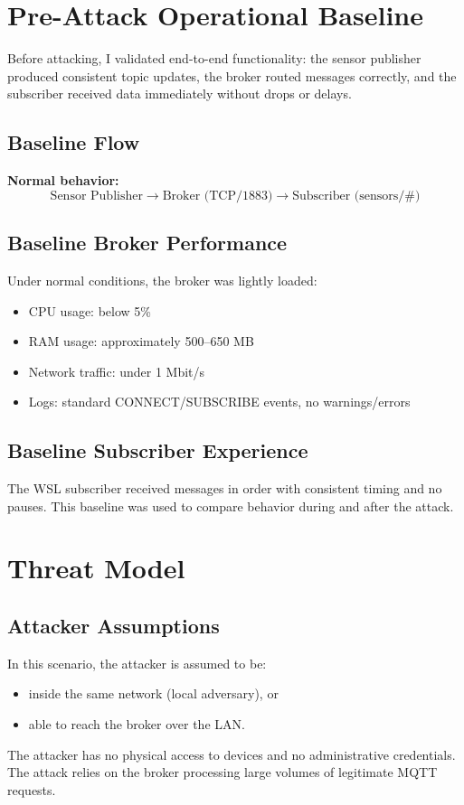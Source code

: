 \documentclass[11pt]{article}
\begin{document}
\section{Pre-Attack Operational Baseline}
Before attacking, I validated end-to-end functionality: the sensor publisher produced consistent topic updates, the broker routed messages correctly, and the subscriber received data immediately without drops or delays.

\subsection{Baseline Flow}
\textbf{Normal behavior:}
\[
\text{Sensor Publisher} \rightarrow \text{Broker (TCP/1883)} \rightarrow \text{Subscriber (sensors/\#)}
\]

\subsection{Baseline Broker Performance}
Under normal conditions, the broker was lightly loaded:
\begin{itemize}
  \item CPU usage: below 5\%
  \item RAM usage: approximately 500--650 MB
  \item Network traffic: under 1 Mbit/s
  \item Logs: standard CONNECT/SUBSCRIBE events, no warnings/errors
\end{itemize}

\subsection{Baseline Subscriber Experience}
The WSL subscriber received messages in order with consistent timing and no pauses. This baseline was used to compare behavior during and after the attack.

\section{Threat Model}
\subsection{Attacker Assumptions}
In this scenario, the attacker is assumed to be:
\begin{itemize}
  \item inside the same network (local adversary), or
  \item able to reach the broker over the LAN.
\end{itemize}
The attacker has no physical access to devices and no administrative credentials. The attack relies on the broker processing large volumes of legitimate MQTT requests.
\end{document}
